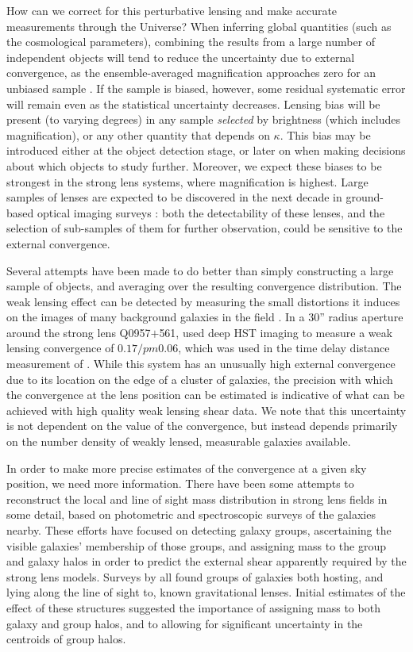 \documentclass[useAMS,usenatbib]{mn2e}
\begin{document}
How can we correct for this perturbative lensing and make accurate
measurements through the Universe? When inferring global quantities
(such as the cosmological parameters), combining the results from a
large number of independent objects will tend to reduce the uncertainty
due to external convergence, as the ensemble-averaged magnification
approaches zero for an unbiased sample \citep[\eg][]{Holz+Linder2005}.
If the sample is biased, however, some residual systematic error will
remain even as the statistical uncertainty decreases. Lensing bias will
be present (to varying degrees) in any sample {\it selected} by
brightness (which includes magnification), or any other quantity that
depends on $\kappa$. This bias may be introduced either at the object
detection stage, or later on when making decisions about which objects
to study further.  Moreover, we expect these biases to be strongest in
the strong lens systems, where magnification is highest. Large samples
of lenses are expected to be discovered in the next decade in
ground-based optical imaging surveys \citep{Oguri+Marshall2010}: both
the detectability of these lenses,  and the selection of sub-samples of
them for further observation, could be sensitive to the external
convergence. 

Several attempts have been made to do better than simply constructing a
large sample of objects, and averaging over the resulting convergence
distribution. The weak lensing effect can be detected by measuring the
small distortions it induces on the images of many background galaxies
in the field \citep[see e.g.][for a review]{SaasFee2006}. In a 30''
radius aperture around the strong lens Q0957$+$561,
\citet{NakajimaEtal2009} used deep HST imaging to measure a weak lensing
convergence of $0.17/pm0.06$, which was used in the time delay distance
measurement of \citep{FadelyEtal2009}. While this system has an
unusually high external convergence due to its location on the edge of a
cluster of galaxies, the precision with which the convergence at the
lens position can be estimated is indicative of what can be achieved
with high quality weak lensing shear data. We note that this uncertainty
is not dependent on the value of the convergence, but instead depends
primarily on the number density of weakly lensed, measurable galaxies
available.

In order to make more precise estimates of the convergence at a given
sky position, we need more information.   There have been some attempts
to reconstruct the local and line of sight mass distribution in strong
lens fields in some detail, based on photometric and spectroscopic
surveys of the galaxies nearby. These efforts have focused on  detecting
galaxy groups, ascertaining the visible galaxies' membership of those
groups, and assigning mass to the group and galaxy halos in order to
predict the external shear apparently required by the strong lens
models. Surveys by
\citet{Fassnacht+Lubin2002,AugerEtal2007,WilliamsEtal2006,MomchevaEtal2006}
all found groups of galaxies both hosting, and lying  along the line of
sight to, known gravitational lenses. Initial estimates of the effect of
these structures suggested the importance of assigning mass to both
galaxy and group halos, and to allowing for significant uncertainty in
the centroids of group halos. 
\end{document}
